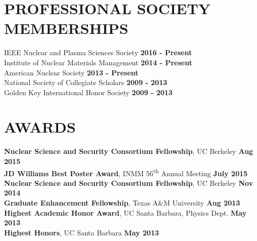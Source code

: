 \documentclass[margin, 10pt]{style/res} %
\begin{document}
\begin{resume}





\section{\small{PROFESSIONAL SOCIETY MEMBERSHIPS}}

IEEE Nuclear and Plasma Sciences Society \hfill  {\bf 2016 - Present}\\
Institute of Nuclear Materials Management \hfill  {\bf 2014 - Present}\\
American Nuclear Society \hfill {\bf 2013 - Present}\\
National Society of Collegiate Scholars \hfill  {\bf 2009 - 2013}\\
Golden Key International Honor Society \hfill  {\bf 2009 - 2013}





\section{\small{AWARDS}}

{\bf Nuclear Science and Security Consortium Fellowship}, UC Berkeley \hfill {\bf Aug 2015}\\
{\bf JD Williams Best Poster Award}, INMM 56\textsuperscript{th} Annual Meeting \hfill {\bf July 2015}\\
{\bf Nuclear Science and Security Consortium Fellowship}, UC Berkeley \hfill {\bf Nov 2014}\\
{\bf Graduate Enhancement Fellowship}, Texas A\&M University \hfill {\bf Aug 2013}\\
{\bf Highest Academic Honor Award}, UC Santa Barbara, Physics Dept. \hfill {\bf May 2013}\\
{\bf Highest Honors}, UC Santa Barbara \hfill {\bf May 2013}


\end{resume}
\end{document}
